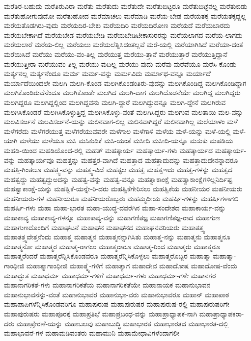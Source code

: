 {ಮರೆತಿರ-ಬಹುದು
ಮರೆತಿರುವಿರಾ
ಮರೆತು
ಮರೆತುದು
ಮರೆತುದೇ
ಮರೆತುಬಿಟ್ಟರೂ
ಮರೆತುಬಿಟ್ಟೆನಲ್ಲ
ಮರೆತುಬಿಡು
ಮರೆತುಹೋಗುವುದೋ
ಮರೆತುಹೋದ
ಮರೆಮಾಚಲು
ಮರೆಮಾಡಿ
ಮರೆಯ-ಬೇಡ
ಮರೆಯತಕ್ಕ
ಮರೆಯತಕ್ಕದ್ದಲ್ಲ
ಮರೆಯತೊಡಗಿರು-ವುದು
ಮರೆಯದಿರ-ಬೇಕು
ಮರೆಯದಿರಿ
ಮರೆಯದಿರೋಣ
ಮರೆಯದೆ
ಮರೆಯಬಾರದು
ಮರೆಯಬೇಕಾಗಿದೆ
ಮರೆಯಬೇಡ
ಮರೆಯಬೇಡಿ
ಮರೆಯಬೇಡಿಟೀಕಾಸುರರನ್ನು
ಮರೆಯಲಾಗದ
ಮರೆಯ-ಲಾಗದು
ಮರೆಯಲಾರೆ
ಮರೆಯ-ಲಿಲ್ಲ
ಮರೆಯಲು
ಮರೆಯಲೆತ್ನಿಸಿದಂತಲ್ಲವೆ
ಮರೆ-ಯಲ್ಲಿ
ಮರೆಯಾಗಿಸಿದೆ
ಮರೆಯಾ-ದಂತೆ
ಮರೆಯಿಸಿದೆ
ಮರೆಯು
ಮರೆಯು-ವಂ-ತಿಲ್ಲ
ಮರೆಯುತ್ತ
ಮರೆಯು-ತ್ತಾನೆ
ಮರೆಯುತ್ತಾರೆ
ಮರೆಯುತ್ತಿದ್ದಾನೆ
ಮರೆಯುತ್ತೀರಾ
ಮರೆಯುವಂ-ತಿಲ್ಲ
ಮರೆಯು-ವುದಿಲ್ಲ
ಮರೆಯು-ವುದು
ಮರೆವು
ಮರೆವೆಯೂ
ಮರೆಸಿ-ಕೊಂಡು
ಮರ್ತ್ಯನಲ್ಲ
ಮರ್ತ್ಯನೆಂದೂ
ಮರ್ಮ
ಮರ್ಮ-ವನ್ನು
ಮರ್ಮವಿದು
ಮರ್ಮಾಥ-ವನ್ನೂ
ಮರ್ಯಾದೆ
ಮರ್ಯಾದೆಯಿಂದಲೇ
ಮಲಗಿ
ಮಲಗಿ-ಕೊಂಡ
ಮಲಗಿಕೊಂಡಂತಿರು-ವುದನ್ನು
ಮಲಗಿಕೊಂಡಿದ್ದ
ಮಲಗಿಕೊಂಡಿದ್ದಾಗ
ಮಲಗಿಕೊಂಡಿರುವೆನೆಂದೂ
ಮಲಗಿಕೊಂಡೇ
ಮಲಗಿದ
ಮಲಗಿ-ದಾಗ
ಮಲಗಿದೊಡನೆಯೇ
ಮಲಗಿದ್ದ
ಮಲಗಿದ್ದರು
ಮಲಗಿದ್ದರೂ
ಮಲಗಿದ್ದಲ್ಲಿಂದ
ಮಲಗಿದ್ದವನು
ಮಲಗಿ-ದ್ದಾರೆ
ಮಲಗಿದ್ದುದನ್ನೂ
ಮಲಗಿ-ದ್ದೇನೆ
ಮಲಗಿರುವ
ಮಲಗಿಸಿಕೊಂಡರೆ
ಮಲಗಿಸಿಕೊಳ್ಳುತ್ತಿದ್ದ
ಮಲಗಿಸಿಕೊಳ್ಳು-ವಂತೆ
ಮಲಗಿಸಿದ್ದರು
ಮಲಗುವ
ಮಲತಾಯಿ
ಮಲ-ವನ್ನು
ಮಲವಿಸರ್ಜನೆ
ಮಲವಿಸರ್ಜನೆ-ಯನ್ನು
ಮಲಿನವಾಗ-ಲಿಲ್ಲ
ಮಲಿನವಾಗಿದ್ದರೆ
ಮಲಿನವಾಗಿಲ್ಲ
ಮಲೆಯಾಳಂ
ಮಳೆ
ಮಳೆಗರೆದು
ಮಳೆಗರೆಯುತ್ತ
ಮಳೆಗರೆಯುವವರೇ
ಮಳೆಗಾಲ
ಮಳೆಗಾಳಿ
ಮಳೆಯ
ಮಳೆ-ಯನ್ನು
ಮಳೆ-ಯಲ್ಲಿ
ಮಳೆ-ಯಾಗಿ
ಮಳೆಯು
ಮಳೆಯೂ
ಮಸಿ
ಮಸಿಕುಡಿಕೆ
ಮಸಿ-ಯಂತೆ
ಮಸೀದಿ
ಮಸೀದಿ-ಯನ್ನೂ
ಮಸುಕು
ಮಹಡಿಯ
ಮಹಡಿ-ಯಿಂದ
ಮಹಡಿಯೊಂದ-ರಲ್ಲಿ
ಮಹತ್
ಮಹತ್ಕಾರ್ಯ
ಮಹತ್ಕಾರ್ಯ-ಗಳು
ಮಹತ್ಕಾರ್ಯದ
ಮಹತ್ಕಾರ್ಯ-ವನ್ನು
ಮಹತ್ಕಾರ್ಯವೂ
ಮಹತ್ತನ್ನು
ಮಹತ್ತರ-ವಾಗಿದೆ
ಮಹತ್ತಾದ
ಮಹತ್ತಾದುದನ್ನು
ಮಹತ್ತಾದುದೇನನ್ನಾದರೂ
ಮಹತ್ತಿ-ಗಿಂತಲೂ
ಮಹತ್ತ್ವ-ವನ್ನು
ಮಹತ್ತ್ವ-ವಿದೆ
ಮಹತ್ಫಲ
ಮಹತ್ವ
ಮಹತ್ವಇದು
ಮಹತ್ವ-ಗಳನ್ನು
ಮಹತ್ವದ
ಮಹತ್ವದ್ದು
ಮಹತ್ವದ್ದುಅದನ್ನು
ಮಹತ್ವ-ವನ್ನು
ಮಹತ್ವ-ವನ್ನೂ
ಮಹತ್ವಾಕಾಂಕ್ಷೆ
ಮಹತ್ವಾಕಾಂಕ್ಷೆಗಳಿಲ್ಲನಿರ್ದಿಷ್ಟ
ಮಹತ್ವಾಕಾಂಕ್ಷೆ-ಯನ್ನು
ಮಹತ್ವಿಕೆ-ಯನ್ನೇ-ರಿ-ದರು
ಮಹತ್ವಿಕೆಗೇರಿಸಲು
ಮಹತ್ವಿಕೆಯ
ಮಹನೀಯರ
ಮಹನೀಯರು
ಮಹನೀಯರು-ಗಳ
ಮಹನೀಯರೂ
ಮಹನೀಯರೊಬ್ಬರು
ಮಹಮ್ಮದೀಯ
ಮಹರ್ಷಿ-ಗಳನ್ನು
ಮಹರ್ಷಿಗಳಾಗಲಿ
ಮಹರ್ಷಿ-ಗಳು
ಮಹಾ
ಮಹಾ-ಭಾರತ
ಮಹಾ-ಯುದ್ಧ-ದವರೆಗಿನ
ಮಹಾ-ಸಂದೇಶದ
ಮಹಾಕಾರ್ಯ-ವನ್ನು
ಮಹಾಕಾವ್ಯ
ಮಹಾಕಾವ್ಯ-ಗಳನ್ನೂ
ಮಹಾಕಾವ್ಯ-ವನ್ನು
ಮಹಾಗಣಿತಜ್ಞ
ಮಹಾಗಣಿತಜ್ಞ-ರಾದ
ಮಹಾಗುಣ
ಮಹಾಗುಣದೊಂದಿಗೆ
ಮಹಾಘಟನೆ
ಮಹಾಘನ
ಮಹಾಘನದ
ಮಹಾಘನವರಿಯರು
ಮಹಾತತ್ತ್ವ
ಮಹಾತತ್ತ್ವವೇತ್ತನೆಂದು
ಮಹಾತ್ಮ
ಮಹಾತ್ಮನ
ಮಹಾತ್ಮನನ್ನಾಗಿಸಿತು
ಮಹಾತ್ಮ-ನನ್ನು
ಮಹಾತ್ಮನು
ಮಹಾತ್ಮನೂ
ಮಹಾತ್ಮನೋ
ಮಹಾತ್ಮರ
ಮಹಾತ್ಮ-ರಾಗಲು
ಮಹಾತ್ಮರಾರೂ
ಮಹಾತ್ಮ-ರಿಂದ
ಮಹಾತ್ಮರು
ಮಹಾತ್ಮರೂ
ಮಹಾತ್ಮರೆಂದರೆ
ಮಹಾತ್ಮರೆನ್ನಿಸಿಕೊಂಡವರೂ
ಮಹಾತ್ಮರೆನ್ನಿಸಿಕೊಳ್ಳಲು
ಮಹಾತ್ಮರೊಬ್ಬರ
ಮಹಾತ್ಮಾ
ಮಹಾತ್ಮಾ-ಗಾಂಧೀಜಿ
ಮಹಾತ್ಮಾಗಾಂಧೀಜಿ
ಮಹಾತ್ಮ್ಯೆ-ಗಳಿಗೆ
ಮಹಾತ್ಯಾಗ
ಮಹಾದೇವ
ಮಹಾದೋಷ
ಮಹಾದೋಷ-ವೆಂದು
ಮಹಾದ್ಭುತ
ಮಹಾಧರ್ಮ
ಮಹಾಧರ್ಮ-ಗಳಿಗೆ
ಮಹಾಧರ್ಮ-ಗಳು
ಮಹಾಧರ್ಮ-ಗಳೇ
ಮಹಾನಗರ
ಮಹಾನಾಗರಿಕತೆ-ಗಳು
ಮಹಾನಾಗರಿಕತೆಯ
ಮಹಾನಾಗರಿಕತೆಯೇ
ಮಹಾನಾಯಕ
ಮಹಾನುಭಾವನ
ಮಹಾನುಭಾವನೆನ್ನು-ವಂತೆ
ಮಹಾನುಭಾವರ
ಮಹಾನುಭಾ-ವರು
ಮಹಾನುಭಾವರೂ
ಮಹಾನ್
ಮಹಾಪಾಠ
ಮಹಾಪಾಪಿಗಳೆನ್ನಿಸಿಕೊಂಡವರಿಗೂ
ಮಹಾಪುರುಷ
ಮಹಾಪುರುಷರ
ಮಹಾಪುರುಷ-ರಲ್ಲಿ
ಮಹಾಪುರುಷರಿಗೇ
ಮಹಾಪುರುಷರು
ಮಹಾಪೂರಕ್ಕೆ
ಮಹಾಪ್ರತಿಭೆ
ಮಹಾಪ್ರಬಂಧ-ವನ್ನು
ಮಹಾಪ್ರಾಧ್ಯಾಪಕ-ನಾಗಿ
ಮಹಾಪ್ರಾಧ್ಯಾಪಕರಾ-ದರು
ಮಹಾಪ್ರೇರಣೆ-ಯನ್ನು
ಮಹಾಬಲವು
ಮಹಾಬುದ್ಧಿ
ಮಹಾಭಾರತ
ಮಹಾಭಾರತದ
ಮಹಾಭಾರತ-ದಲ್ಲಿ
ಮಹಾಭಾವನೆ-ಗಳ
ಮಹಾಮಡಿವಂತರು
ಮಹಾಮುನಿ
ಮಹಾಮೇಧಾವಿಗಳೆಂದಾಗಲೀ
}
